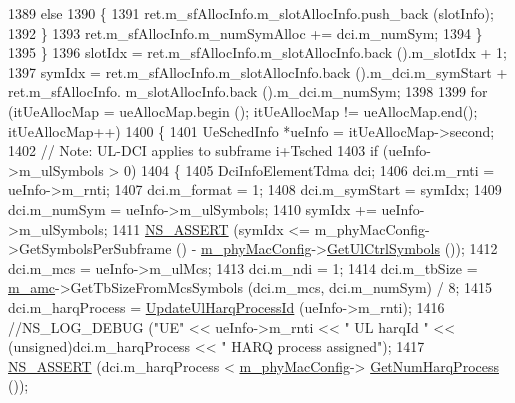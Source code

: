 \begin{DoxyCode}
1389                         \textcolor{keywordflow}{else}
1390                         \{
1391                                 ret.m\_sfAllocInfo.m\_slotAllocInfo.push\_back (slotInfo);
1392                         \}
1393                         ret.m\_sfAllocInfo.m\_numSymAlloc += dci.m\_numSym;
1394                 \}
1395         \}
1396         slotIdx = ret.m\_sfAllocInfo.m\_slotAllocInfo.back ().m\_slotIdx + 1;
1397         symIdx = ret.m\_sfAllocInfo.m\_slotAllocInfo.back ().m\_dci.m\_symStart + ret.m\_sfAllocInfo.
      m\_slotAllocInfo.back ().m\_dci.m\_numSym;
1398 
1399         \textcolor{keywordflow}{for} (itUeAllocMap = ueAllocMap.begin (); itUeAllocMap != ueAllocMap.end(); itUeAllocMap++)
1400         \{
1401                 UeSchedInfo *ueInfo = itUeAllocMap->second;
1402                 \textcolor{comment}{// Note: UL-DCI applies to subframe i+Tsched}
1403                 \textcolor{keywordflow}{if} (ueInfo->m\_ulSymbols > 0)
1404                 \{
1405                         DciInfoElementTdma dci;
1406                         dci.m\_rnti = ueInfo->m\_rnti;
1407                         dci.m\_format = 1;
1408                         dci.m\_symStart = symIdx;
1409                         dci.m\_numSym = ueInfo->m\_ulSymbols;
1410                         symIdx += ueInfo->m\_ulSymbols;
1411                         \hyperlink{assert_8h_a6dccdb0de9b252f60088ce281c49d052}{NS\_ASSERT} (symIdx <= m\_phyMacConfig->GetSymbolsPerSubframe () - 
      \hyperlink{classns3_1_1MmWaveMacScheduler_a24d7af4971d2e500fe543cefbafa2fd9}{m\_phyMacConfig}->\hyperlink{classns3_1_1MmWavePhyMacCommon_aa0bf8af14050bc5dc6513fbc86319a9b}{GetUlCtrlSymbols} ());
1412                         dci.m\_mcs = ueInfo->m\_ulMcs;
1413                         dci.m\_ndi = 1;
1414                         dci.m\_tbSize = \hyperlink{classns3_1_1MmWaveFlexTtiMaxWeightMacScheduler_a36c22ad89fe5d6743a058f253a43a70d}{m\_amc}->GetTbSizeFromMcsSymbols (dci.m\_mcs, dci.m\_numSym) / 8;
1415                         dci.m\_harqProcess = \hyperlink{classns3_1_1MmWaveFlexTtiMaxWeightMacScheduler_ab4b8aad5817e031322f14f1a4fb718c0}{UpdateUlHarqProcessId} (ueInfo->m\_rnti);
1416                         \textcolor{comment}{//NS\_LOG\_DEBUG ("UE" << ueInfo->m\_rnti << " UL harqId " <<
       (unsigned)dci.m\_harqProcess << " HARQ process assigned");}
1417                         \hyperlink{assert_8h_a6dccdb0de9b252f60088ce281c49d052}{NS\_ASSERT} (dci.m\_harqProcess < \hyperlink{classns3_1_1MmWaveMacScheduler_a24d7af4971d2e500fe543cefbafa2fd9}{m\_phyMacConfig}->
      \hyperlink{classns3_1_1MmWavePhyMacCommon_a40773d84172ebeb5aff125f56ebcc5ac}{GetNumHarqProcess} ());

\end{DoxyCode}

